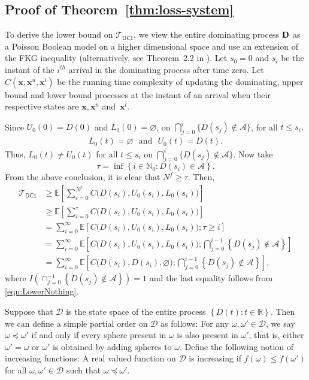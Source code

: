 \documentclass[11pt]{article}
\newcommand{\ee}{\mathbb{E}}
\newcommand{\reals}{\mathbb{R}}
\newcommand{\mbb}{\mathbb}
\newcommand{\lt}{\left}
\newcommand{\rt}{\right}
\newcommand{\lfs}{\mathbf{x}}
\newcommand{\comDCone}{\mathcal{T}_{\mathsf{DC1}}}
\begin{document}
\begin{appendices}
\subsection{Proof of Theorem~\ref{thm:loss-system}}
To derive the lower bound on $\comDCone$, we view the entire dominating process $\mathbf{D}$
as a Poisson Boolean model on a higher dimensional space and use an extension of the FKG inequality \cite{MR96}
(alternatively, see Theorem~2.2 in \cite{MR96}). 
Let $s_0 = 0$ and $s_i$ be the instant of the $i^{th}$ arrival in the dominating process after time zero.
Let $C(\lfs, \lfs^u, \lfs^l)$ be the running time complexity of updating the dominating, upper bound and lower bound processes
at the instant of an arrival when their respective states are $\lfs, \lfs^u$ and~$\lfs^l$.

Since $U_0(0) = D(0)$ and $L_0(0) = \varnothing$, on $\bigcap_{j=0}^i \{D(s_j) \notin \mathscr{A}\}$, for all $t \leq s_i,$
\begin{align}
\label{eqn:LowerNothing}
 L_0(t) = \varnothing\,\, \text{ and } \,\, U_0(t) = D(t).
\end{align}
Thus,  $L_0(t) \neq U_0(t)$ for all $t \leq s_i$
on $\bigcap_{j=0}^i \{D(s_j) \notin \mathscr{A}\}$.
Now take $$\tau = \inf\lt\{i \in \mbb{N}_0: D(s_i) \in \mathscr{A}\rt\}.$$ From the above conclusion, it  is clear that $N^f \geq \tau$.
Then,
\begin{align*}
 \mathcal{T}_{\mathsf{DC1}} &\geq \ee\lt[\sum_{i=0}^{N^f} C\Big(D(s_i), U_0(s_i), L_0(s_i)\Big) \rt]\\
 & \geq \ee\lt[\sum_{i=0}^{\tau } C\Big(D(s_i), U_0(s_i), L_0(s_i)\Big) \rt]\nonumber\\
                  &= \sum_{i=0}^\infty \ee\lt[ C\Big(D(s_i), U_0(s_i), L_0(s_i)\Big) ; \tau \geq i \rt]\nonumber\\
                  &= \sum_{i=0}^\infty \ee\lt[ C\Big(D(s_i), U_0(s_i), L_0(s_i)\Big) ; \bigcap_{j=0}^{i -1} \lt\{D(s_j) \notin \mathscr{A}\rt\}\rt]\nonumber\\
                  &= \sum_{i=0}^\infty \ee\lt[ C\Big(D(s_i), D(s_i), \varnothing\Big) ; \bigcap_{j=0}^{i -1} \lt\{D(s_j) \notin \mathscr{A}\rt\}\rt],\nonumber
\end{align*}
where $I\lt(\cap_{j=0}^{-1} \lt\{D(s_j) \notin \mathscr{A}\rt\} \rt) = 1$ and the last equality follows from \eqref{eqn:LowerNothing}.

Suppose that $\mathscr{D}$ is the state space of the entire process $\lt\{ D(t) : t \in \reals \rt\}$. Then we can define a simple partial order on $\mathscr{D}$ as follows:
For any $\omega, \omega' \in \mathscr{D}$, we say $\omega \preceq \omega'$ if and only if every sphere present in $\omega$ is also present in $\omega'$, that is, either $\omega' = \omega$ or $\omega'$ is obtained by
adding spheres to $\omega$. Define the following notion of increasing functions: A real valued function on $\mathscr{D}$ is increasing if $f(\omega) \leq f(\omega')$ for all
$\omega, \omega' \in \mathscr{D}$ such that $\omega \preceq \omega'$.



\end{appendices}
\end{document}

